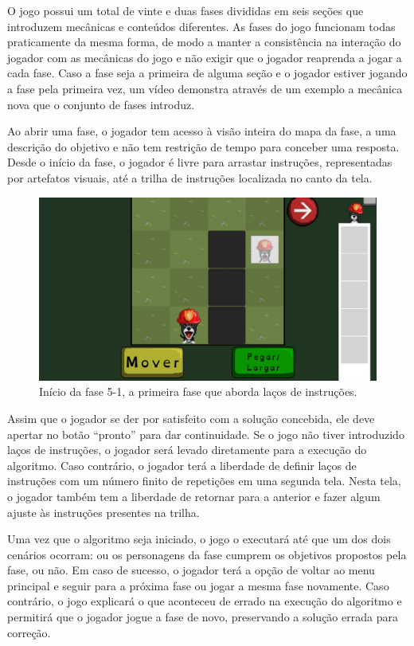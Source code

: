 \documentclass[conference]{IEEEtran}
\begin{document}
O jogo possui um total de vinte e duas fases divididas em seis seções que introduzem mecânicas e conteúdos diferentes. As fases do jogo funcionam todas praticamente da mesma forma, de modo a manter a consistência na interação do jogador com as mecânicas do jogo e não exigir que o jogador reaprenda a jogar a cada fase. Caso a fase seja a primeira de alguma seção e o jogador estiver jogando a fase pela primeira vez, um vídeo demonstra através de um exemplo a mecânica nova que o conjunto de fases introduz.

Ao abrir uma fase, o jogador tem acesso à visão inteira do mapa da fase, a uma descrição do objetivo e não tem restrição de tempo para conceber uma resposta. Desde o início da fase, o jogador é livre para arrastar instruções, representadas por artefatos visuais, até a trilha de instruções localizada no canto da tela.

\begin{figure}[htbp]
\centerline{\includegraphics[scale=0.275]{images/fig01.jpg}}
\caption{Início da fase 5-1, a primeira fase que aborda laços de instruções.}
\label{fig}
\end{figure}

Assim que o jogador se der por satisfeito com a solução concebida, ele deve apertar no botão ``pronto'' para dar continuidade. Se o jogo não tiver introduzido laços de instruções, o jogador será levado diretamente para a execução do algoritmo. Caso contrário, o jogador terá a liberdade de definir laços de instruções com um número finito de repetições em uma segunda tela. Nesta tela, o jogador também tem a liberdade de retornar para a anterior e fazer algum ajuste às instruções presentes na trilha.

Uma vez que o algoritmo seja iniciado, o jogo o executará até que um dos dois cenários ocorram: ou os personagens da fase cumprem os objetivos propostos pela fase, ou não. Em caso de sucesso, o jogador terá a opção de voltar ao menu principal e seguir para a próxima fase ou jogar a mesma fase novamente. Caso contrário, o jogo explicará o que aconteceu de errado na execução do algoritmo e permitirá que o jogador jogue a fase de novo, preservando a solução errada para correção.
\end{document}
